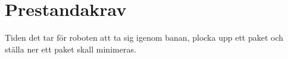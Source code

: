 \section{Prestandakrav}
Tiden det tar för roboten att ta sig igenom banan, plocka upp ett paket och ställa ner ett paket skall minimeras.
